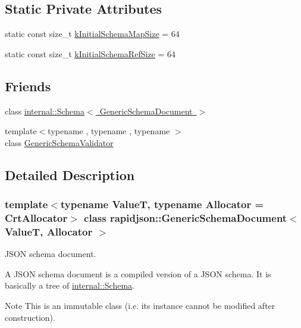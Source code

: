 \subsection*{Static Private Attributes}
\begin{DoxyCompactItemize}
\item 
static const size\+\_\+t \mbox{\hyperlink{classrapidjson_1_1_generic_schema_document_a5557711a06945d5fa29cd89104fef97c}{k\+Initial\+Schema\+Map\+Size}} = 64
\item 
static const size\+\_\+t \mbox{\hyperlink{classrapidjson_1_1_generic_schema_document_ade647f0de2c0f37bcfd34975759e9123}{k\+Initial\+Schema\+Ref\+Size}} = 64
\end{DoxyCompactItemize}
\subsection*{Friends}
\begin{DoxyCompactItemize}
\item 
class \mbox{\hyperlink{classrapidjson_1_1_generic_schema_document_a706511849688d9245fc37109f02a03c4}{internal\+::\+Schema$<$ Generic\+Schema\+Document $>$}}
\item 
{\footnotesize template$<$typename , typename , typename $>$ }\\class \mbox{\hyperlink{classrapidjson_1_1_generic_schema_document_afcc03e6ba8f1a819e1a028c31ad38347}{Generic\+Schema\+Validator}}
\end{DoxyCompactItemize}


\subsection{Detailed Description}
\subsubsection*{template$<$typename ValueT, typename Allocator = Crt\+Allocator$>$\newline
class rapidjson\+::\+Generic\+Schema\+Document$<$ Value\+T, Allocator $>$}

J\+S\+ON schema document. 

A J\+S\+ON schema document is a compiled version of a J\+S\+ON schema. It is basically a tree of \mbox{\hyperlink{classrapidjson_1_1internal_1_1_schema}{internal\+::\+Schema}}.

\begin{DoxyNote}{Note}
This is an immutable class (i.\+e. its instance cannot be modified after construction). 
\end{DoxyNote}

